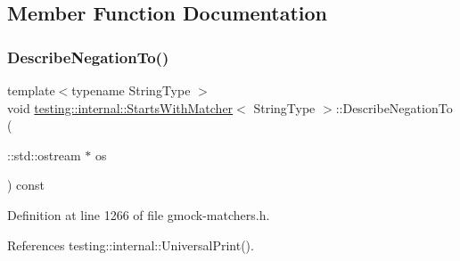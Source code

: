 \subsection{Member Function Documentation}
\mbox{\label{classtesting_1_1internal_1_1StartsWithMatcher_aae30b57dac10fec73d454b6d7543acea}} 
\subsubsection{\texorpdfstring{Describe\+Negation\+To()}{DescribeNegationTo()}}
{\footnotesize\ttfamily template$<$typename String\+Type $>$ \\
void \hyperlink{classtesting_1_1internal_1_1StartsWithMatcher}{testing\+::internal\+::\+Starts\+With\+Matcher}$<$ String\+Type $>$\+::Describe\+Negation\+To (\begin{DoxyParamCaption}\item[{\+::std\+::ostream $\ast$}]{os }\end{DoxyParamCaption}) const\hspace{0.3cm}{\ttfamily [inline]}}



Definition at line 1266 of file gmock-\/matchers.\+h.



References testing\+::internal\+::\+Universal\+Print().


